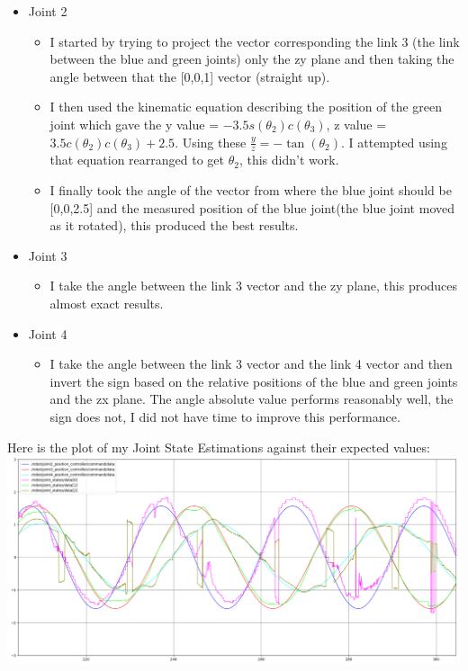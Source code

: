 \documentclass[12pt]{article}
\begin{document}
\begin{itemize}
    \item Joint 2
    \begin{itemize}
        \item I started by trying to project the vector corresponding the link 3 (the link between the blue and green joints) only the zy plane and then taking the angle between that the [0,0,1] vector (straight up).
        \item I then used the kinematic equation describing the position of the green joint which gave the y value = $-3.5s\left(\theta_{2}\right)c\left(\theta_{3}\right)$, z value = $3.5c\left(\theta_{2}\right)c\left(\theta_{3}\right) + 2.5$. Using these $\frac{y}{z} = -\tan(\theta_{2})$. I attempted using that equation rearranged to get $\theta_{2}$, this didn't work.
        \item I finally took the angle of the vector from where the blue joint should be [0,0,2.5] and the measured position of the blue joint(the blue joint moved as it rotated), this produced the best results.
    \end{itemize}
    \item Joint 3
    \begin{itemize}
        \item I take the angle between the link 3 vector and the zy plane, this produces almost exact results.
    \end{itemize}
    \item Joint 4
    \begin{itemize}
        \item I take the angle between the link 3 vector and the link 4 vector and then invert the sign based on the relative positions of the blue and green joints and the zx plane. The angle absolute value performs reasonably well, the sign does not, I did not have time to improve this performance.
    \end{itemize}
\end{itemize}
\newline \nelwine
Here is the plot of my Joint State Estimations against their expected values:\newline
\includegraphics[width=\textwidth]{best angle tracking.png}
\end{document}
